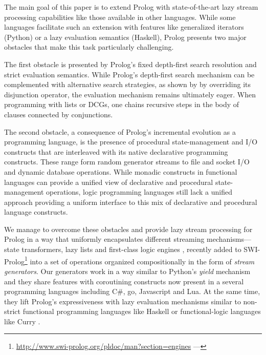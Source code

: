 \documentclass{new_tlp}
\begin{document}
The main goal of this paper is to extend Prolog with state-of-the-art lazy
stream processing capabilities like those available in other languages.
While some languages facilitate such an extension with features like
generalized iterators (Python) or a lazy evaluation semantics (Haskell), 
Prolog presents two major obstacles that make this task particularly challenging.

The first obstacle is presented by Prolog's fixed depth-first search resolution
and strict evaluation semantics. While Prolog's depth-first search mechanism
can be complemented with alternative search strategies, as shown by 
by overriding its disjunction operator, the evaluation mechanism remains
ultimately eager. When programming with lists or DCGs, one chains recursive
steps in the body of clauses connected by conjunctions. 

The second obstacle, a consequence of Prolog's incremental evolution as a
programming language, is the presence of procedural state-management and I/O
constructs that are interleaved with its native declarative programming
constructs. These range form random generator streams to file and socket I/O
and dynamic database operations.  While monadic constructs in functional
languages \cite{moggi:monads,wadler93:cont}  can provide  a unified view of
declarative and procedural state-management operations, logic programming
languages still lack a unified approach providing a uniform interface to this
mix of declarative and procedural language constructs.

 
We manage to overcome these obstacles and provide lazy stream
processing for Prolog in a way that uniformly encapsulates
different streaming mechanisms---state transformers, lazy lists and first-class logic engines 
\cite{tarau:cl2000,padl09inter,bp2011}, 
recently added to SWI-Prolog\footnote{
\url{http://www.swi-prolog.org/pldoc/man?section=engines}
---} into a set of operations organized compositionally in the form of {\em 
stream generators}.
Our generators work in a way similar to Python's {\em yield} mechanism \cite{pyref,beazley09} and 
they share features with coroutining constructs now present in a several  programming languages including C\#, go, Javascript and Lua. At the same time, 
they lift Prolog's expressiveness with lazy evaluation mechanisms similar to non-strict
functional programming languages like Haskell \cite{hudak07} or functional-logic languages like Curry \cite{antoy05}.
\end{document}
